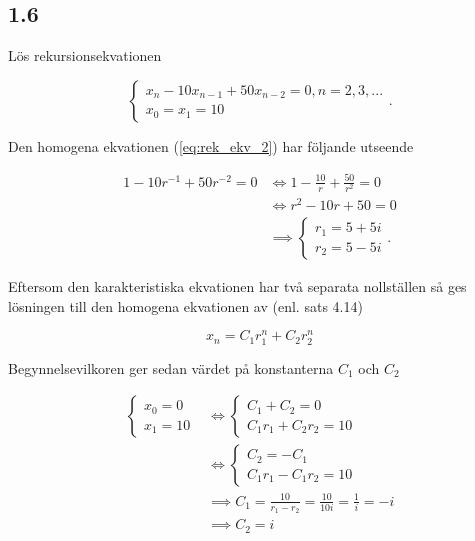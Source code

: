 \documentclass[a4paper]{article}
\begin{document}
\subsection*{1.6}

Lös rekursionsekvationen

\begin{equation}
	\begin{cases}
		x_{n} - 10x_{n-1} + 50x_{n-2} = 0, n = 2,3,...\\
		x_0 = x_1 = 10
	\end{cases}\label{eq:rek_ekv_2}.
\end{equation}

Den homogena ekvationen (\ref{eq:rek_ekv_2}) har följande utseende

\begin{align*}
	1 - 10r^{-1} + 50r^{-2} = 0 &\iff 1 - \frac{10}{r} + \frac{50}{r^2} = 0\\
								&\iff r^2 - 10r + 50 = 0\\
								&\implies	\begin{cases}
												r_1 = 5 + 5i\\
												r_2 = 5 - 5i
											\end{cases}.
\end{align*}

Eftersom den karakteristiska ekvationen har två separata nollställen så ges lösningen till den homogena ekvationen av (enl. sats 4.14)

\begin{equation*}
	x_n = C_1r_1^n + C_2r_2^n
\end{equation*}
	
Begynnelsevilkoren ger sedan värdet på konstanterna $C_1$ och $C_2$

\begin{align*}
	\begin{cases}
		x_0 = 0\\
		x_1 = 10
	\end{cases}
	&\iff
	\begin{cases}
		C_1 + C_2 = 0\\
		C_1r_1 + C_2r_2 = 10
	\end{cases}\\
	&\iff
	\begin{cases}
		C_2 = -C_1\\
		C_1r_1 - C_1r_2 = 10
	\end{cases}\\
	&\implies C_1 = \frac{10}{r_1 - r_2} = \frac{10}{10i} = \frac{1}{i} = -i\\
	&\implies C_2 = i
\end{align*}
\end{document}
